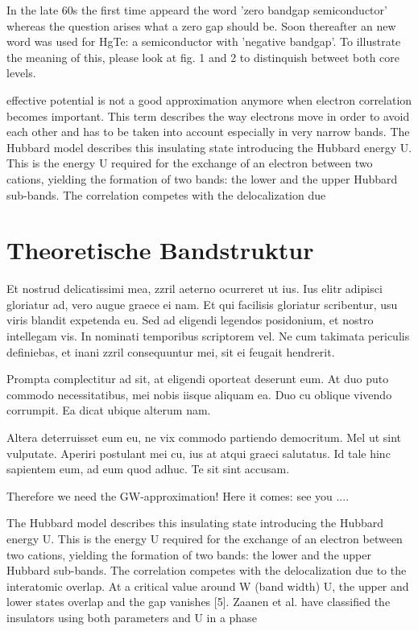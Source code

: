 \documentclass[11pt,twoside,german]{book}
\begin{document}
In the late 60s the first time appeard the word 'zero bandgap semiconductor' whereas the question arises what a zero gap should be. Soon thereafter an new word was used for HgTe: a semiconductor with 'negative bandgap'. To illustrate the meaning of this, please look at fig. 1 and 2 to distinquish betweet both core levels.

effective potential is not a
good approximation anymore when electron correlation becomes important.
This term describes the way electrons move in order to avoid each other and
has to be taken into account especially in very narrow bands. The Hubbard
model describes this insulating state introducing the Hubbard energy
U. This is the energy U required for the exchange of an electron between
two cations, yielding the formation of two bands: the lower and the upper
Hubbard sub-bands. The correlation competes with the delocalization due

\section{Theoretische Bandstruktur}

Et nostrud delicatissimi mea, zzril aeterno ocurreret ut ius. Ius elitr adipisci gloriatur ad, vero augue graece ei nam. Et qui facilisis gloriatur scribentur, usu viris blandit expetenda eu. Sed ad eligendi legendos posidonium, et nostro intellegam vis. In nominati temporibus scriptorem vel. Ne cum takimata periculis definiebas, et inani zzril consequuntur mei, sit ei feugait hendrerit.

Prompta complectitur ad sit, at eligendi oporteat deserunt eum. At duo puto commodo necessitatibus, mei nobis iisque aliquam ea. Duo cu oblique vivendo corrumpit. Ea dicat ubique alterum nam.

Altera deterruisset eum eu, ne vix commodo partiendo democritum. Mel ut sint vulputate. Aperiri postulant mei cu, ius at atqui graeci salutatus. Id tale hinc sapientem eum, ad eum quod adhuc. Te sit sint accusam.

Therefore we need the GW-approximation! Here it comes: see you ....

The Hubbard
model describes this insulating state introducing the Hubbard energy
U. This is the energy U required for the exchange of an electron between
two cations, yielding the formation of two bands: the lower and the upper
Hubbard sub-bands. The correlation competes with the delocalization due
to the interatomic overlap. At a critical value around W (band width) 
U, the upper and lower states overlap and the gap vanishes [5]. Zaanen et
al. have classified the insulators using both parameters  and U in a phase
\end{document}
